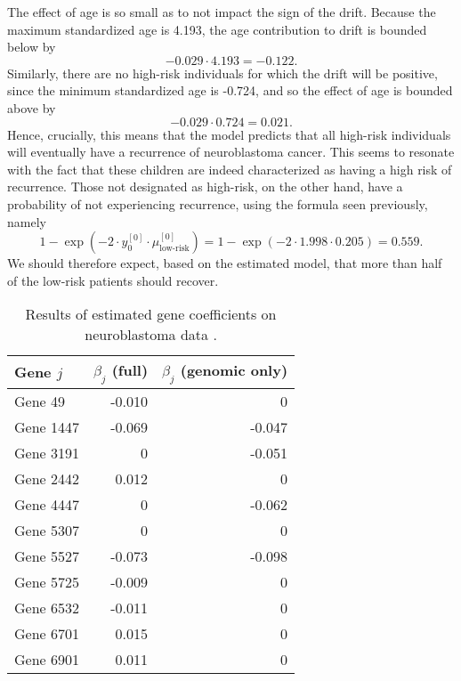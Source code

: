 The effect of age is so small as to not impact the sign of the drift.
Because the maximum standardized age is 4.193, the age contribution to drift is bounded below by 
\begin{equation*}
    -0.029\cdot4.193=-0.122.
\end{equation*}
Similarly, there are no high-risk individuals for which the drift will be positive, since the minimum standardized age is -0.724, and so the effect of age is bounded above by
\begin{equation*}
    -0.029\cdot0.724=0.021.
\end{equation*}
Hence, crucially, this means that the model predicts that all high-risk individuals will eventually have a recurrence of neuroblastoma cancer.
This seems to resonate with the fact that these children are indeed characterized as having a high risk of recurrence.
Those not designated as high-risk, on the other hand, have a probability of not experiencing recurrence, using the formula seen previously, namely
\begin{equation*}
    1-\exp{(-2\cdot y_{0}^{[0]}\cdot\mu_{\text{low-risk}}^{[0]})}=1-\exp{(-2\cdot 1.998\cdot 0.205)}=0.559.
\end{equation*}
We should therefore expect, based on the estimated model, that more than half of the low-risk patients should recover.


\begin{table}
\caption{Results of estimated gene coefficients on neuroblastoma data \citep{oberthuer-data}.}
\label{tab:oberthuer-beta}
\centering
\begin{tabular}{lrr}
\toprule
Gene $j$      & $\beta_j$ (full) & $\beta_j$ (genomic only)\\
\hline
Gene 49   & -0.010  &      0  \\
Gene 1447 & -0.069  & -0.047  \\
Gene 3191 &      0  & -0.051  \\
Gene 2442 &  0.012  &      0  \\
Gene 4447 &      0  & -0.062  \\
Gene 5307 &      0  &      0  \\
Gene 5527 & -0.073  & -0.098  \\
Gene 5725 & -0.009  &      0  \\
Gene 6532 & -0.011  &      0  \\
Gene 6701 &  0.015  &      0  \\
Gene 6901 &  0.011  &      0  \\
\bottomrule
\end{tabular}
\end{table}

